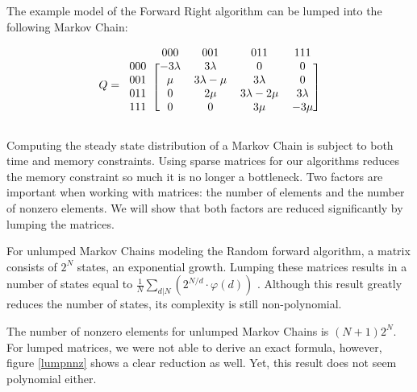\documentclass[10pt,a4paper]{article}
\begin{document}
The example model of the Forward Right algorithm can be lumped into the following Markov Chain:

\[ Q =
  \begin{blockarray}{ccccc}
    & 000 & 001 & 011 & 111 \\
    \begin{block}{c[cccc]}
    000 & -3\lambda & 3\lambda & 0 & 0 \\
    001 & \mu & 3\lambda-\mu & 3\lambda & 0 \\
    011 & 0 & 2\mu & 3\lambda-2\mu & 3\lambda \\
    111 & 0 & 0 & 3\mu & -3\mu \\
    \end{block}
  \end{blockarray}
\]

Computing the steady state distribution of a Markov Chain is subject to both time and memory constraints. Using sparse matrices for our algorithms reduces the memory constraint so much it is no longer a bottleneck.
Two factors are important when working with matrices: the number of elements and the number of nonzero elements. We will show that both factors are reduced significantly by lumping the matrices.

For unlumped Markov Chains modeling the Random forward algorithm, a matrix consists of $2^N$ states, an exponential growth. Lumping these matrices results in a number of states equal to  $\frac{1}{N} \sum_{d|N} (2^{N/d} \cdot \varphi(d) )$ \cite{A000031}. Although this result greatly reduces the number of states, its complexity is still non-polynomial.

The number of nonzero elements for unlumped Markov Chains is $(N+1) 2^N$. For lumped matrices, we were not able to derive an exact formula, however, figure \ref{lumpnnz} shows a clear reduction as well. Yet, this result does not seem polynomial either.
\end{document}
